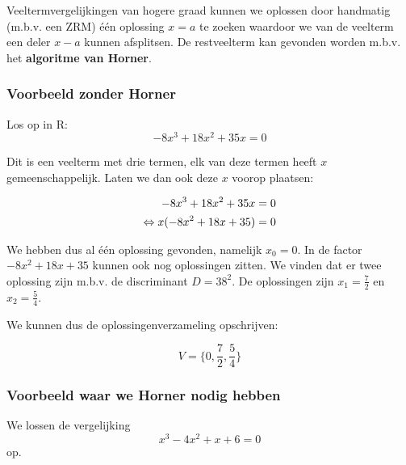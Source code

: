 \documentclass[12pt,twoside,a4paper]{article}
\begin{document}
Veeltermvergelijkingen van hogere graad kunnen we oplossen door handmatig (m.b.v. een ZRM) één oplossing $x=a$ te zoeken waardoor we van de veelterm een deler $x-a$ kunnen afsplitsen. De restveelterm kan gevonden worden m.b.v. het {\bf algoritme van Horner}.

\subsubsection*{Voorbeeld zonder Horner}

Los op in R:
\[-8x^3+18x^2+35x=0\]

Dit is een veelterm met drie termen, elk van deze termen heeft $x$ gemeenschappelijk. Laten we dan ook deze $x$ voorop plaatsen:

\begin{eqnarray*}
  -8x^3+18x^2+35x &= 0\\
  \Leftrightarrow x(-8x^2+18x+35) &= 0
\end{eqnarray*}

We hebben dus al één oplossing gevonden, namelijk $x_0=0$. In de factor $-8x^2+18x+35$ kunnen ook nog oplossingen zitten. We vinden dat er twee oplossing zijn m.b.v. de discriminant $D=38^2$. De oplossingen zijn $x_1=\frac{7}{2}$ en $x_2=\frac{5}{4}$.

We kunnen dus de oplossingenverzameling opschrijven:

\[V=\{0, \dfrac{7}{2}, \dfrac{5}{4}\}\]

\subsubsection*{Voorbeeld waar we Horner nodig hebben}

We lossen de vergelijking $$x^3-4x^2+x+6=0$$ op.
\end{document}
